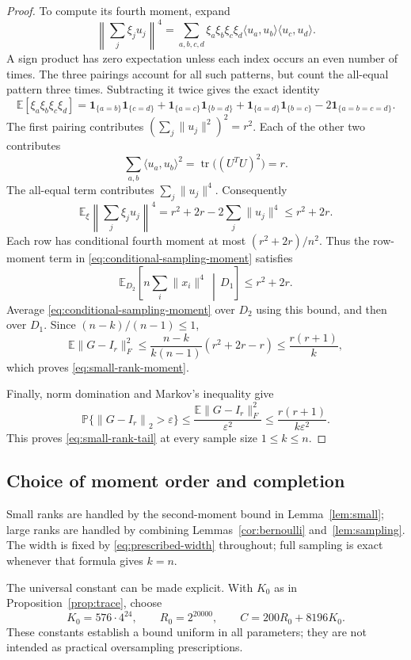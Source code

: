 \documentclass[11pt]{article}
\theoremstyle{definition}
\theoremstyle{remark}
\theoremstyle{plain}
\newcommand{\E}{\mathbb E}
\newcommand{\Prob}{\mathbb P}
\newcommand{\one}{\mathbf 1}
\DeclareMathOperator{\tr}{tr}
\newcommand{\norm}[1]{\left\lVert#1\right\rVert_2}
\begin{document}
\begin{proof}
To compute its fourth moment, expand
\[
 \left\|\sum_j\xi_j u_j\right\|^4
   =\sum_{a,b,c,d}\xi_a\xi_b\xi_c\xi_d
                    \langle u_a,u_b\rangle\langle u_c,u_d\rangle.
\]
A sign product has zero expectation unless each index occurs an
even number of times. The three pairings account for all such
patterns, but count the all-equal pattern three times. Subtracting
it twice gives the exact identity
\[
 \E[\xi_a\xi_b\xi_c\xi_d]
   =\one_{\{a=b\}}\one_{\{c=d\}}
     +\one_{\{a=c\}}\one_{\{b=d\}}
     +\one_{\{a=d\}}\one_{\{b=c\}}
     -2\one_{\{a=b=c=d\}}.
\]
The first pairing contributes $(\sum_j\|u_j\|^2)^2=r^2$.
Each of the other two contributes
\[
 \sum_{a,b}\langle u_a,u_b\rangle^2
    =\tr\bigl((U^TU)^2\bigr)=r.
\]
The all-equal term contributes $\sum_j\|u_j\|^4$. Consequently
\[
 \E_{\xi}\left\|\sum_j\xi_j u_j\right\|^4
             =r^2+2r-2\sum_j\|u_j\|^4\le r^2+2r.
\]
Each row has conditional fourth moment at most $(r^2+2r)/n^2$.
Thus the row-moment
term in \eqref{eq:conditional-sampling-moment} satisfies
\[
 \E_{D_2}\!\left[n\sum_i\|x_i\|^4\,\middle|\,D_1\right]
       \le r^2+2r.
\]
Average \eqref{eq:conditional-sampling-moment} over $D_2$ using
this bound, and then over $D_1$. Since $(n-k)/(n-1)\le1$,
\[
 \E\|G-I_r\|_F^2
    \le\frac{n-k}{k(n-1)}(r^2+2r-r)
    \le\frac{r(r+1)}k,
\]
which proves \eqref{eq:small-rank-moment}.

Finally, norm domination and Markov's inequality give
\[
 \Prob\{\norm{G-I_r}>\varepsilon\}
    \le\frac{\E\|G-I_r\|_F^2}{\varepsilon^2}
    \le\frac{r(r+1)}{k\varepsilon^2}.
\]
This proves \eqref{eq:small-rank-tail} at every sample size $1\le k\le n$.
\end{proof}
\subsection{Choice of moment order and completion}

Small ranks are handled by the second-moment bound in
Lemma~\ref{lem:small}; large ranks are handled by combining
Lemmas~\ref{cor:bernoulli} and~\ref{lem:sampling}.
The width is fixed by \eqref{eq:prescribed-width} throughout;
full sampling is exact whenever that formula gives $k=n$.

The universal constant can be made explicit. With $K_0$ as in
Proposition~\ref{prop:trace}, choose
\begin{equation}\label{eq:universal-constants}
 K_0=576\cdot4^{24},\qquad R_0=2^{20000},\qquad
 C=200R_0+8196K_0.
\end{equation}
These constants establish a bound uniform in all parameters; they
are not intended as practical oversampling prescriptions.
\end{document}
